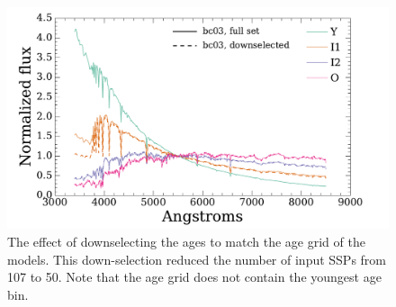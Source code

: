 
\begin{figure}
  \centering
  \includegraphics[width=\columnwidth]{891_2/figs/bc_downselect.pdf}
  \caption[Effect of downselecting BC03 age
    resolution]{\fixspacing\label{891_2:fig:bc03_downselect}The effect
    of downselecting the  ages to match the age
    grid of the  models. This down-selection
    reduced the number of input SSPs from 107 to 50. Note that the
     age grid does not contain the youngest age
    bin.}
\end{figure}

